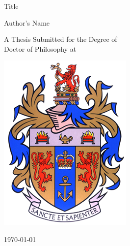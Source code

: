 \thispagestyle{empty}
\begin{center}
	\begin{minipage}{0.75\linewidth}
		\centering
		{{\LARGE Title} \par}
		\vspace{5cm}
		{\large Author's Name \par}
		\vspace{5cm}
		\begin{spacing}{1.5}
		{\large A Thesis Submitted for the Degree of \\ Doctor of Philosophy at \\ \university \par}
		\end{spacing}
		\vspace{1cm}
		\includegraphics[width=0.3\linewidth]{Figs/KCL_Logo}
		\par
		\vspace{1cm}
		{\large {} \today }
	\end{minipage}
\end{center}

